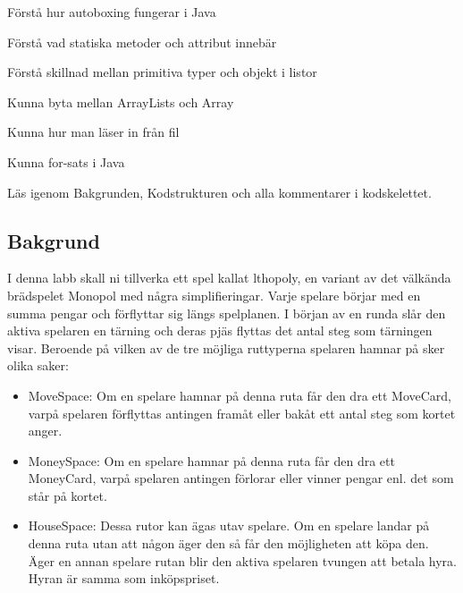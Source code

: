 

\Teamlab{\LabWeekELEVEN}

\begin{Goals}
\item Förstå hur autoboxing fungerar i Java
\item Förstå vad statiska metoder och attribut innebär
\item Förstå skillnad mellan primitiva typer och objekt i listor
\item Kunna byta mellan ArrayLists och Array
\item Kunna hur man läser in från fil
\item Kunna for-sats i Java
\end{Goals}

\begin{Preparations}
\item {}
\item Läs igenom Bakgrunden, Kodstrukturen och alla kommentarer i kodskelettet.

\end{Preparations}

\subsection{Bakgrund}
I denna labb skall ni tillverka ett spel kallat lthopoly, en variant av det välkända brädspelet Monopol med några simplifieringar. Varje spelare börjar med en summa pengar och förflyttar sig längs spelplanen.
I början av en runda slår den aktiva spelaren en tärning och deras pjäs flyttas det antal steg som tärningen visar. 
Beroende på vilken av de tre möjliga ruttyperna spelaren hamnar på sker olika saker:

\begin{itemize}
\item MoveSpace: Om en spelare hamnar på denna ruta får den dra ett MoveCard, varpå spelaren förflyttas antingen framåt eller bakåt ett antal steg som kortet anger.
\item MoneySpace: Om en spelare hamnar på denna ruta får den dra ett MoneyCard, varpå spelaren antingen förlorar eller vinner pengar enl. det som står på kortet.
\item HouseSpace: Dessa rutor kan ägas utav spelare. Om en spelare landar på denna ruta utan att någon äger den så får den möjligheten att köpa den. Äger en annan spelare rutan blir den aktiva spelaren tvungen att betala hyra. Hyran är samma som inköpspriset.
\end{itemize}

